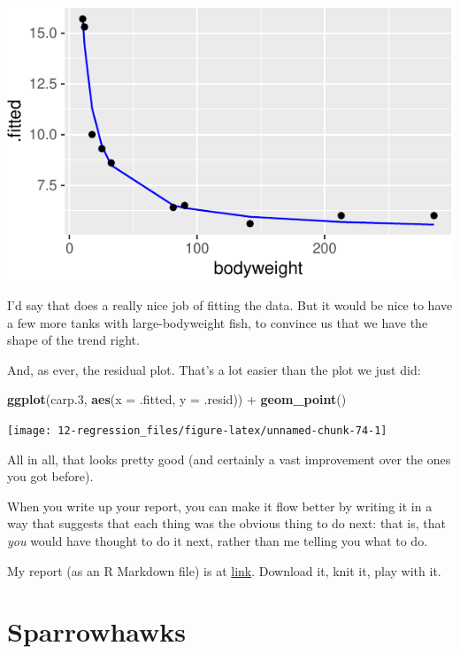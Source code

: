 \documentclass[]{tufte-book}
\newenvironment{Shaded}{}{}
\newcommand{\DataTypeTok}[1]{\textcolor[rgb]{0.56,0.13,0.00}{#1}}
\newcommand{\FloatTok}[1]{\textcolor[rgb]{0.25,0.63,0.44}{#1}}
\newcommand{\KeywordTok}[1]{\textcolor[rgb]{0.00,0.44,0.13}{\textbf{#1}}}
\newcommand{\NormalTok}[1]{#1}
\newcommand{\OperatorTok}[1]{\textcolor[rgb]{0.40,0.40,0.40}{#1}}
\newcommand{\StringTok}[1]{\textcolor[rgb]{0.25,0.44,0.63}{#1}}
\theoremstyle{definition}
\theoremstyle{definition}
\theoremstyle{definition}
\theoremstyle{remark}
\begin{document}
\includegraphics{12-regression_files/figure-latex/augment2-1}

I'd say that does a really nice job of fitting the data. But it would be
nice to have a few more tanks with large-bodyweight fish, to convince us
that we have the shape of the trend right.

And, as ever, the residual plot. That's a lot easier than the plot we
just did:

\begin{Shaded}
\begin{Highlighting}[]
\KeywordTok{ggplot}\NormalTok{(carp}\FloatTok{.3}\NormalTok{, }\KeywordTok{aes}\NormalTok{(}\DataTypeTok{x =}\NormalTok{ .fitted, }\DataTypeTok{y =}\NormalTok{ .resid)) }\OperatorTok{+}\StringTok{ }
\StringTok{    }\KeywordTok{geom_point}\NormalTok{()}
\end{Highlighting}
\end{Shaded}

\texttt{[image: 12-regression\_files/figure-latex/unnamed-chunk-74-1]}

All in all, that looks pretty good (and certainly a vast improvement
over the ones you got before).

When you write up your report, you can make it flow better by writing it
in a way that suggests that each thing was the obvious thing to do next:
that is, that \emph{you} would have thought to do it next, rather than
me telling you what to do.

My report (as an R Markdown file) is at
\href{http://www.utsc.utoronto.ca/~butler/c32/carp.Rmd}{link}. Download
it, knit it, play with it.

\hypertarget{sparrowhawks}{%
\section{Sparrowhawks}\label{sparrowhawks}}
\end{document}
